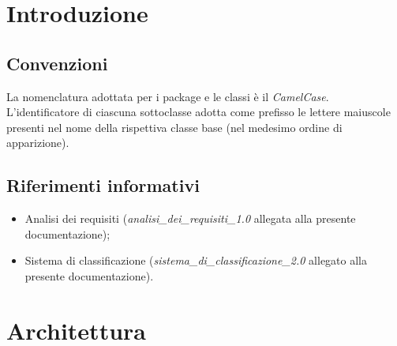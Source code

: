 \documentclass[10pt,a4paper,headinclude,footinclude,hidelinks]{scrreprt} %
\begin{document}
	\tableofcontents

	\chapter{Introduzione}
	\label{ch:stage:design:intro}



	\section{Convenzioni}
	La nomenclatura adottata per i package e le classi è il \textit{CamelCase}.	L'identificatore di ciascuna sottoclasse adotta come prefisso le lettere maiuscole presenti nel nome della rispettiva classe base (nel medesimo ordine di apparizione). 

	\section{Riferimenti informativi}
	\begin{itemize}
	\item Analisi dei requisiti (\textit{analisi\_dei\_requisiti\_1.0} allegata alla presente documentazione);
	\item Sistema di classificazione (\textit{sistema\_di\_classificazione\_2.0} allegato alla presente documentazione).
	\end{itemize}

	\chapter{Architettura}
	\label{ch:stage:design:architettura}
\end{document}

